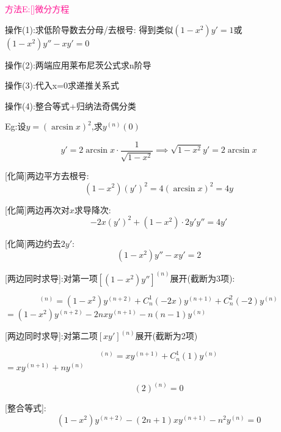\documentclass[11pt,a4paper,UTF8]{ctexart}
\begin{document}
\textcolor{DeepPink}{方法E:[]微分方程}

\begin{solbox}[分步推导与答题规范]
操作(1):求低阶导数去分母/去根号:	   得到类似$(1-x^2)y' = 1$或$(1-x^2)y'' - x y' = 0$

操作(2):两端应用莱布尼茨公式求n阶导

操作(3):代入x=0求递推关系式

操作(4):整合等式+归纳法奇偶分类

\end{solbox}

Eg:设$y = (\arcsin x)^2$,求$y^{(n)}(0)$

\begin{solbox}[分步推导与答题规范]

\begin{equation*}
y' = 2\arcsin x \cdot \frac{1}{\sqrt{1-x^2}} \implies \sqrt{1-x^2} y' = 2\arcsin x
\end{equation*}


[化简]两边平方去根号:    	
\begin{equation*}
(1-x^2)(y')^2 = 4(\arcsin x)^2 = 4y
\end{equation*}


[化简]两边再次对$x$求导降次:	
\begin{equation*}
-2x(y')^2 + (1-x^2) \cdot 2y'y'' = 4y'
\end{equation*}


[化简]两边约去$2y'$:		
\begin{equation*}
(1-x^2)y'' - xy' = 2
\end{equation*}


[两边同时求导]:对第一项$[(1-x^2)y'']^{(n)}$展开(截断为3项):


\begin{equation*}
[(1-x^2)y'']^{(n)} = (1-x^2)y^{(n+2)} + C_n^1 (-2x) y^{(n+1)} + C_n^2 (-2) y^{(n)}
\end{equation*}
	$= (1-x^2)y^{(n+2)} - 2nx y^{(n+1)} - n(n-1)y^{(n)}$

[两边同时求导]:对第二项$[xy']^{(n)}$展开(截断为2项)


\begin{equation*}
[xy']^{(n)} = x y^{(n+1)} + C_n^1 (1) y^{(n)}
\end{equation*}
				$= x y^{(n+1)} + n y^{(n)}$


\begin{equation*}
(2)^{(n)} = 0
\end{equation*}


[整合等式]:	  
\begin{equation*}
(1-x^2)y^{(n+2)} - (2n+1)x y^{(n+1)} - n^2 y^{(n)} = 0
\end{equation*}



\end{solbox}
\end{document}
